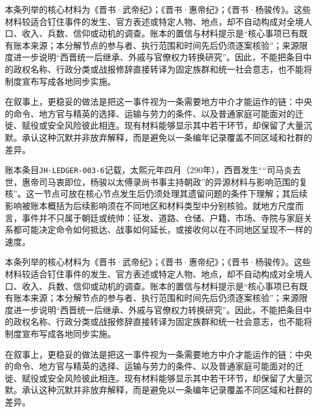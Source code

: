 本条列举的核心材料为《晋书·武帝纪》；《晋书·惠帝纪》；《晋书·杨骏传》。这些材料较适合钉住事件的发生、官方表述或特定人物、地点，却不自动构成对全境人口、收入、兵数、信仰或动机的调查。账本的置信与材料提示是“核心事项已有既有账本来源；本分解节点的参与者、执行范围和时间先后仍须逐案核验”；来源限度进一步说明“西晋统一后继承、外戚与官僚权力转换研究”。因此，不能把条目中的政权名称、行政分类或战报修辞直接转译为固定族群和统一社会意志，也不能将制度宣布写成各地同步实施。

在叙事上，更稳妥的做法是把这一事件视为一条需要地方中介才能运作的链：中央的命令、地方官与精英的选择、运输与劳力的条件、以及普通家庭可能面对的迁徙、赋役或安全风险彼此相连。现有材料能够显示其中若干环节，却保留了大量沉默。承认这种沉默并非放弃解释，而是避免以一条编年记录覆盖不同区域和社群的差异。

账本条目\texttt{JH-LEDGER-003-6}记载，太熙元年四月（290年），西晋发生““司马炎去世，惠帝司马衷即位，杨骏以太傅录尚书事主持朝政”的异源材料与影响范围的复核”。这一节点可放在核心节点发生后仍须处理其遗留问题的条件下理解；其后续影响被账本概括为后续影响须在不同地区和材料类型中分别核验。就地方尺度而言，事件并不只属于朝廷或统帅：征发、道路、仓储、户籍、市场、寺院与家庭关系都可能决定命令如何抵达、战事如何延长，或接收何以在不同地区呈现不一样的速度。

本条列举的核心材料为《晋书·武帝纪》；《晋书·惠帝纪》；《晋书·杨骏传》。这些材料较适合钉住事件的发生、官方表述或特定人物、地点，却不自动构成对全境人口、收入、兵数、信仰或动机的调查。账本的置信与材料提示是“核心事项已有既有账本来源；本分解节点的参与者、执行范围和时间先后仍须逐案核验”；来源限度进一步说明“西晋统一后继承、外戚与官僚权力转换研究”。因此，不能把条目中的政权名称、行政分类或战报修辞直接转译为固定族群和统一社会意志，也不能将制度宣布写成各地同步实施。

在叙事上，更稳妥的做法是把这一事件视为一条需要地方中介才能运作的链：中央的命令、地方官与精英的选择、运输与劳力的条件、以及普通家庭可能面对的迁徙、赋役或安全风险彼此相连。现有材料能够显示其中若干环节，却保留了大量沉默。承认这种沉默并非放弃解释，而是避免以一条编年记录覆盖不同区域和社群的差异。
